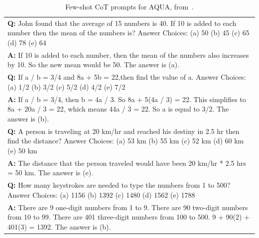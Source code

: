 \documentclass{article} %
\begin{document}
\begin{table}[h]
    \caption{
    Few-shot CoT prompts for AQUA, from~\cite{Wang2022SelfConsistencyIC}.
    }
    \centering
    \small
    \begin{tabular}{p{13.5cm}}
        \toprule
        \textbf{Q:} John found that the average of 15 numbers is 40. If 10 is added to each number then the mean of the numbers is? Answer Choices: (a) 50 (b) 45 (c) 65 (d) 78 (e) 64\\
        \vspace{-1mm}
        \textbf{A:} If 10 is added to each number, then the mean of the numbers also increases by 10. So the new mean would be 50. The answer is (a). \\
        \vspace{0mm}
        \textbf{Q:} If a / b = 3/4 and 8a + 5b = 22,then find the value of a. Answer Choices: (a) 1/2 (b) 3/2 (c) 5/2 (d) 4/2 (e) 7/2\\
        \vspace{-1mm}
        \textbf{A:} If a / b = 3/4, then b = 4a / 3. So 8a + 5(4a / 3) = 22. This simplifies to 8a + 20a / 3 = 22, which means 44a / 3 = 22. So a is equal to 3/2. The answer is (b).\\
        \vspace{0mm}
        \textbf{Q:} A person is traveling at 20 km/hr and reached his destiny in 2.5 hr then find the distance? Answer Choices: (a) 53 km (b) 55 km (c) 52 km (d) 60 km (e) 50 km\\
        \vspace{-1mm}
        \textbf{A:} The distance that the person traveled would have been 20 km/hr * 2.5 hrs = 50 km. The answer is (e).\\
        \vspace{0mm}
        \textbf{Q:} How many keystrokes are needed to type the numbers from 1 to 500? Answer Choices: (a) 1156 (b) 1392 (c) 1480 (d) 1562 (e) 1788\\
        \vspace{-1mm}
        \textbf{A:} There are 9 one-digit numbers from 1 to 9. There are 90 two-digit numbers from 10 to 99. There are 401 three-digit numbers from 100 to 500. 9 + 90(2) + 401(3) = 1392. The answer is (b).\\
        \bottomrule
    \end{tabular}
    \label{tab:prompt-aqua}
\end{table}
\end{document}
